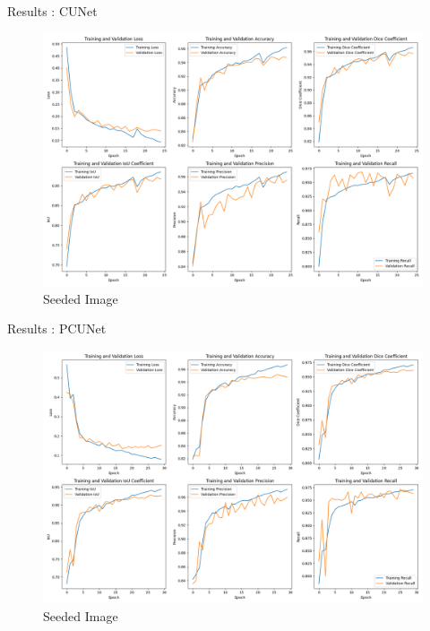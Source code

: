 \documentclass{beamer}
\begin{document}
\begin{frame}{Results : CUNet}
    \begin{figure}[H]
        \centering
        \includegraphics[width=\textwidth]{cunet_metrics.png}
        \caption{Seeded Image}
        \label{fig:RCU}
    \end{figure}
\end{frame}

\begin{frame}{Results : PCUNet}
    \begin{figure}[H]
            \centering
            \includegraphics[width=\textwidth]{pcunet_metrics.png}
            \caption{Seeded Image}
            \label{fig:RPCU}
    \end{figure}
\end{frame}
\end{document}
